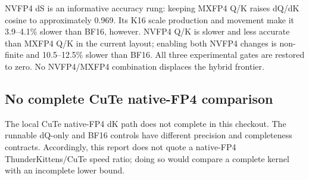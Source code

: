 NVFP4 dS is an informative accuracy rung: keeping MXFP4 Q/K raises dQ/dK
cosine to approximately 0.969.  Its K16 scale production and movement make it
3.9--4.1\% slower than BF16, however.  NVFP4 Q/K is slower and less accurate
than MXFP4 Q/K in the current layout; enabling both NVFP4 changes is non-finite
and 10.5--12.5\% slower than BF16.  All three experimental gates are restored
to zero.  No NVFP4/MXFP4 combination displaces the hybrid frontier.

\subsection{No complete CuTe native-FP4 comparison}

The local CuTe native-FP4 dK path does not complete in this checkout.  The
runnable dQ-only and BF16 controls have different precision and completeness
contracts.  Accordingly, this report does not quote a native-FP4
ThunderKittens/CuTe speed ratio; doing so would compare a complete kernel with
an incomplete lower bound.
